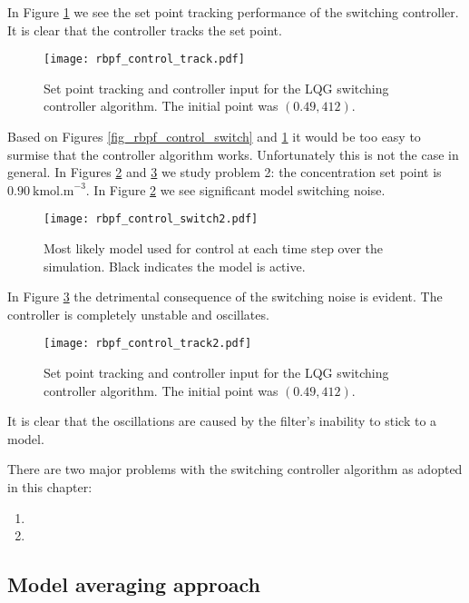 In Figure \ref{fig_rbpf_control_track} we see the set point tracking performance of the switching controller. It is clear that the controller tracks the set point.
\begin{figure}[H] 
\centering
\texttt{[image: rbpf\_control\_track.pdf]}
\caption{Set point tracking and controller input for the LQG switching controller algorithm. The initial point was $(0.49, 412)$.}
\label{fig_rbpf_control_track}
\end{figure}
Based on Figures \ref{fig_rbpf_control_switch} and \ref{fig_rbpf_control_track} it would be too easy to surmise that the controller algorithm works. Unfortunately this is not the case in general. In Figures \ref{fig_rbpf_control_switch2} and \ref{fig_rbpf_control_track2} we study problem 2: the concentration set point is $0.90~\text{kmol.m}^{-3}$. In Figure \ref{fig_rbpf_control_switch2} we see significant model switching noise.
\begin{figure}[H] 
\centering
\texttt{[image: rbpf\_control\_switch2.pdf]}
\caption{Most likely model used for control at each time step over the simulation. Black indicates the model is active.}
\label{fig_rbpf_control_switch2}
\end{figure}
In Figure \ref{fig_rbpf_control_track2} the detrimental consequence of the switching noise is evident. The controller is completely unstable and oscillates.
\begin{figure}[H] 
\centering
\texttt{[image: rbpf\_control\_track2.pdf]}
\caption{Set point tracking and controller input for the LQG switching controller algorithm. The initial point was $(0.49, 412)$.}
\label{fig_rbpf_control_track2}
\end{figure}
It is clear that the oscillations are caused by the filter's inability to stick to a model. 






There are two major problems with the switching controller algorithm as adopted in this chapter:
\begin{enumerate}
\item

\item

\end{enumerate}



\subsection{Model averaging approach}
\label{sec_ma_rbpf}


